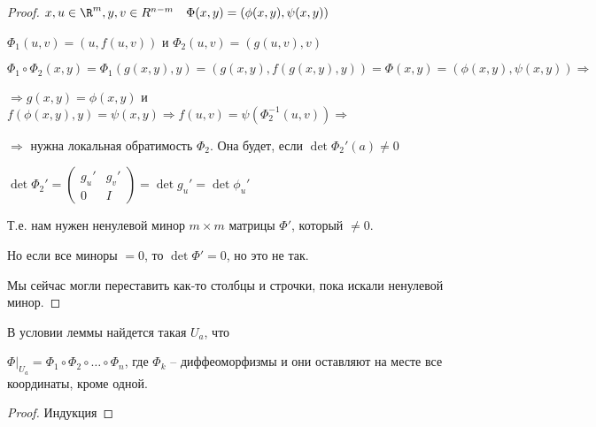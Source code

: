 \begin{proof}\thmslashn

	$x, u \in \R^m, y, v \in R^{n-m} \quad \Phi(x, y) = (\phi(x, y), \psi(x, y))$
	
	$\Phi_1(u, v) = (u, f(u, v))$ и $\Phi_2(u, v) = (g(u, v), v)$
	
	$\Phi_1 \circ \Phi_2 (x, y) = \Phi_1(g(x,y), y) = (g(x, y), f(g(x, y), y)) = \Phi (x, y) = (\phi(x, y), \psi(x, y)) \Rightarrow$
	
	$\Rightarrow g(x, y) = \phi(x, y)$ и $f(\phi(x, y), y) = \psi(x, y) \Rightarrow f(u, v) = \psi(\Phi_2^{-1}(u, v)) \Rightarrow$ 
	
	$\Rightarrow$ нужна локальная обратимость $\Phi_2$. Она будет, если $\det \Phi_2'(a) \not = 0$
	
	$\det\Phi_2' = \begin{pmatrix}
	g_u' & g_v'\\
	0 & I
	\end{pmatrix} = \det g_u' = \det \phi_u'$
	
	Т.е. нам нужен ненулевой минор $m\times m$ матрицы $\Phi'$, который $\not = 0$. 
	
	Но если все миноры $=0$, то $\det\Phi' = 0$, но это не так.
	
	Мы сейчас могли переставить как-то столбцы и строчки, пока искали ненулевой минор.

\end{proof}


\begin{consequence}\thmslashn

	В условии леммы найдется такая $U_a$, что
	
	$\left. \Phi\right|_{U_a} = \Phi_1\circ \Phi_2 \circ \ldots \circ \Phi_n$, где $\Phi_k$ -- диффеоморфизмы и они оставляют на месте все координаты, кроме одной.

\end{consequence}

\begin{proof}Индукция
\end{proof}

